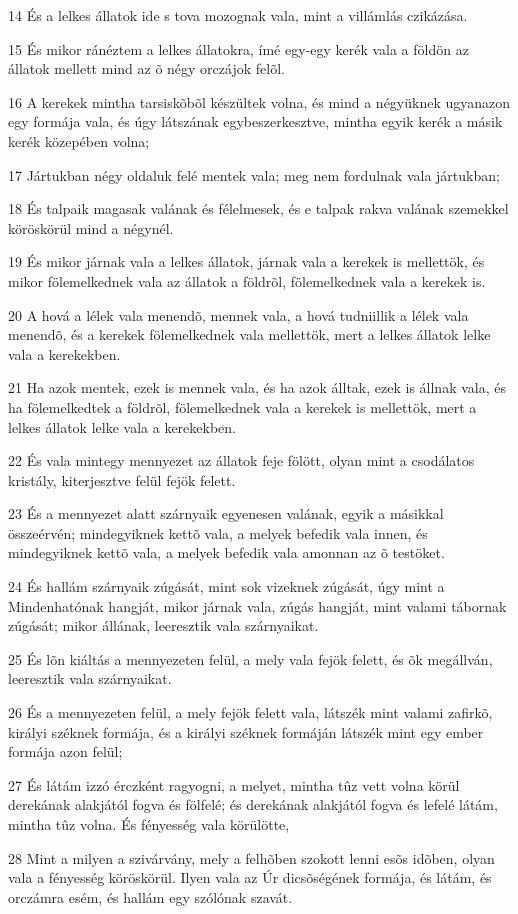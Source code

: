 \par 14 És a lelkes állatok ide s tova mozognak vala, mint a villámlás czikázása.
\par 15 És mikor ránéztem a lelkes állatokra, ímé egy-egy kerék vala a földön az állatok mellett mind az õ négy orczájok felõl.
\par 16 A kerekek mintha tarsiskõbõl készültek volna, és mind a négyüknek ugyanazon egy formája vala, és úgy látszának egybeszerkesztve, mintha egyik kerék a másik kerék közepében volna;
\par 17 Jártukban négy oldaluk felé mentek vala; meg nem fordulnak vala jártukban;
\par 18 És talpaik magasak valának és félelmesek, és e talpak rakva valának szemekkel köröskörül mind a négynél.
\par 19 És mikor járnak vala a lelkes állatok, járnak vala a kerekek is mellettök, és mikor fölemelkednek vala az állatok a földrõl, fölemelkednek vala a kerekek is.
\par 20 A hová a lélek vala menendõ, mennek vala, a hová tudniillik a lélek vala menendõ, és a kerekek fölemelkednek vala mellettök, mert a lelkes állatok lelke vala a kerekekben.
\par 21 Ha azok mentek, ezek is mennek vala, és ha azok álltak, ezek is állnak vala, és ha fölemelkedtek a földrõl, fölemelkednek vala a kerekek is mellettök, mert a lelkes állatok lelke vala a kerekekben.
\par 22 És vala mintegy mennyezet az állatok feje fölött, olyan mint a csodálatos kristály, kiterjesztve felül fejök felett.
\par 23 És a mennyezet alatt szárnyaik egyenesen valának, egyik a másikkal összeérvén; mindegyiknek kettõ vala, a melyek befedik vala innen, és mindegyiknek kettõ vala, a melyek befedik vala amonnan az õ testöket.
\par 24 És hallám szárnyaik zúgását, mint sok vizeknek zúgását, úgy mint a Mindenhatónak hangját, mikor járnak vala, zúgás hangját, mint valami tábornak zúgását; mikor állának, leeresztik vala szárnyaikat.
\par 25 És lõn kiáltás a mennyezeten felül, a mely vala fejök felett, és õk megállván, leeresztik vala szárnyaikat.
\par 26 És a mennyezeten felül, a mely fejök felett vala, látszék mint valami zafirkõ, királyi széknek formája, és a királyi széknek formáján látszék mint egy ember formája azon felül;
\par 27 És látám izzó érczként ragyogni, a melyet, mintha tûz vett volna körül derekának alakjától fogva és fölfelé; és derekának alakjától fogva és lefelé látám, mintha tûz volna. És fényesség vala körülötte,
\par 28 Mint a milyen a szivárvány, mely a felhõben szokott lenni esõs idõben, olyan vala a fényesség köröskörül. Ilyen vala az Úr dicsõségének formája, és látám, és orczámra esém, és hallám egy szólónak szavát.

